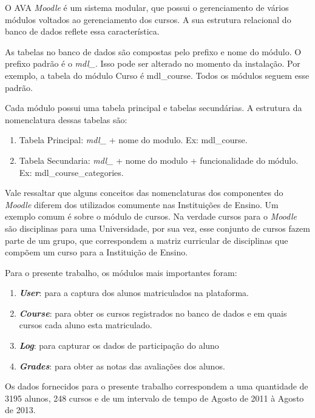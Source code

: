 O AVA \textit{Moodle} é um sistema modular, que possui o gerenciamento de vários módulos voltados ao gerenciamento dos cursos. A sua estrutura relacional do banco de dados reflete essa característica.


As tabelas no banco de dados são compostas pelo prefixo e nome do módulo. O prefixo padrão é o \textit{mdl\_}. Isso pode ser alterado no momento da instalação. Por exemplo, a tabela do módulo Curso é mdl\_course. Todos os módulos seguem esse padrão.

Cada módulo possui uma tabela principal e tabelas secundárias. A estrutura da nomenclatura dessas tabelas são:
\begin{enumerate}
\item Tabela Principal: \textit{mdl\_} + nome do modulo. Ex: mdl\_course.
\item Tabela Secundaria: \textit{mdl\_} + nome do modulo + funcionalidade do módulo. Ex: mdl\_course\_categories.
\end{enumerate}

Vale ressaltar que alguns conceitos das nomenclaturas dos componentes do \textit{Moodle} diferem dos utilizados comumente nas Instituições de Ensino. Um exemplo comum é sobre o módulo de cursos. Na verdade cursos para o \textit{Moodle} são disciplinas para uma Universidade, por sua vez, esse conjunto de cursos fazem parte de um grupo, que correspondem a matriz curricular de disciplinas que compõem um curso para a Instituição de Ensino.

Para o presente trabalho, os módulos mais importantes foram:
\begin{enumerate}
\item \textbf{\textit{User}}: para a captura dos alunos matriculados na plataforma.
\item \textbf{\textit{Course}}: para obter os cursos registrados no banco de dados e em quais cursos cada aluno esta matriculado.
\item \textbf{\textit{Log}}: para capturar os dados de participação do aluno
\item \textbf{\textit{Grades}}: para obter as notas das avaliações dos alunos.
\end{enumerate}


Os dados fornecidos para o presente trabalho correspondem a uma quantidade de 3195 alunos, 248 cursos e de um intervalo de tempo de Agosto de 2011 à Agosto de 2013.

